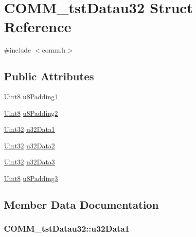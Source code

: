 \hypertarget{struct_c_o_m_m__tst_datau32}{}\section{C\+O\+M\+M\+\_\+tst\+Datau32 Struct Reference}
\label{struct_c_o_m_m__tst_datau32}


{\ttfamily \#include $<$comm.\+h$>$}

\subsection*{Public Attributes}
\begin{DoxyCompactItemize}
\item 
\hyperlink{_d_s_p2833x___device_8h_af84840501dec18061d18a68c162a8fa2}{Uint8} \hyperlink{struct_c_o_m_m__tst_datau32_ac4377a3f1946af211f6c670fd443ee91}{u8\+Padding1}
\item 
\hyperlink{_d_s_p2833x___device_8h_af84840501dec18061d18a68c162a8fa2}{Uint8} \hyperlink{struct_c_o_m_m__tst_datau32_aa3f93c745abb5d9fa4e837a0105be5d8}{u8\+Padding2}
\item 
\hyperlink{_d_s_p2833x___device_8h_aba99025e657f892beb7ff31cecf64653}{Uint32} \hyperlink{struct_c_o_m_m__tst_datau32_a0ce0f3c39e161a55ff4762bf1ebbe557}{u32\+Data1}
\item 
\hyperlink{_d_s_p2833x___device_8h_aba99025e657f892beb7ff31cecf64653}{Uint32} \hyperlink{struct_c_o_m_m__tst_datau32_abf79270f34239131d76c1a4a3d0b5d18}{u32\+Data2}
\item 
\hyperlink{_d_s_p2833x___device_8h_aba99025e657f892beb7ff31cecf64653}{Uint32} \hyperlink{struct_c_o_m_m__tst_datau32_af48b7a86c089616c67ec13b90f57f638}{u32\+Data3}
\item 
\hyperlink{_d_s_p2833x___device_8h_af84840501dec18061d18a68c162a8fa2}{Uint8} \hyperlink{struct_c_o_m_m__tst_datau32_a2ac8a5f484c5f558f923a0130ba2ed5f}{u8\+Padding3}
\end{DoxyCompactItemize}


\subsection{Member Data Documentation}
\hypertarget{struct_c_o_m_m__tst_datau32_a0ce0f3c39e161a55ff4762bf1ebbe557}{}
\subsubsection[{u32\+Data1}]{ C\+O\+M\+M\+\_\+tst\+Datau32\+::u32\+Data1}\label{struct_c_o_m_m__tst_datau32_a0ce0f3c39e161a55ff4762bf1ebbe557}
\hypertarget{struct_c_o_m_m__tst_datau32_abf79270f34239131d76c1a4a3d0b5d18}{}
